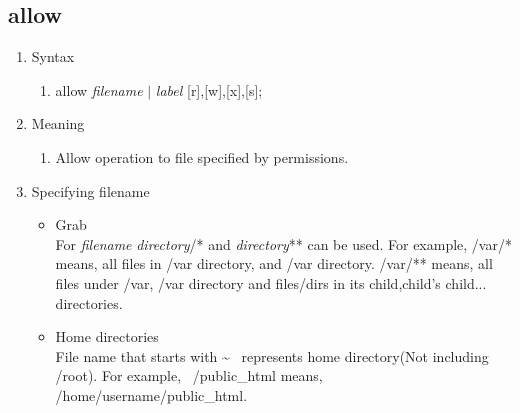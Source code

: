 \documentclass{article}
\begin{document}
\subsection{allow}\label{section:allow}
 \begin{enumerate}
  \item Syntax
	\begin{enumerate}
	 \item allow {\it filename} $\mid$ {\it label} [r],[w],[x],[s];
	\end{enumerate}
  \item Meaning\\
	\begin{enumerate}
	 \item  Allow operation to file specified by permissions. 
	\end{enumerate}
  \item Specifying filename\\
	\begin{itemize}
	 \item Grab\\
	       For {\it filename} {\it directory}/* and {\it directory}** can
	be used.  For example, /var/* means, all files in /var
	directory, and /var directory. /var/** means, all files under
	/var, /var directory and files/dirs in its
	child,child's child... 	directories.
	 \item Home directories\\
	       File name that starts with  \textasciitilde ~ represents
	       home directory(Not including /root).
	       For example, ~/public\_html means, /home/username/public\_html.
	\end{itemize}


\end{enumerate}
\end{document}

